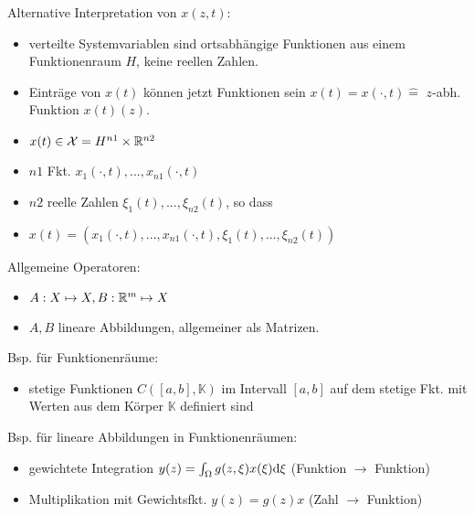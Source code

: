Alternative Interpretation von $x(z,t)$:
\begin{itemize}
\item verteilte Systemvariablen sind ortsabhängige Funktionen aus einem Funktionenraum $H$, keine reellen Zahlen.


\item  Einträge von $x(t)$ können jetzt Funktionen sein
\subitem $x(t) = x(\cdot,t) \hat{=}$ $z$-abh. Funktion $x(t)(z)$.

\item $x(t) \in \mathcal{X} = H^{n1} \times \mathbb{R}^{n2}$ 

\item $n1$ Fkt. $x_1(\cdot,t),...,x_{n1}(\cdot,t)$
\item $n2$ reelle Zahlen $\xi_1(t),...,\xi_{n2}(t)$, so dass

\item $x(t) = (x_1(\cdot,t),...,x_{n1}(\cdot,t),\xi_1(t),...,\xi_{n2}(t))$
\end{itemize}
Allgemeine Operatoren:
\begin{itemize}
\item $A:X\mapsto X, B:\mathbb{R}^m \mapsto X$
\item $A,B$ lineare Abbildungen, allgemeiner als Matrizen. 
\end{itemize}
Bsp. für Funktionenräume:
\begin{itemize}
\item stetige Funktionen $C([a,b],\mathbb{K})$ im Intervall $[a,b]$ auf dem stetige Fkt. mit Werten aus dem Körper $\mathbb{K}$ definiert sind
\end{itemize}
Bsp. für lineare Abbildungen in Funktionenräumen:
\begin{itemize}
\item gewichtete Integration $y(z) = \int_\Omega g(z,\xi)x(\xi) \mathrm{d} \xi$  (Funktion $\rightarrow$ Funktion)
\item Multiplikation mit Gewichtsfkt. $y(z)=g(z)x$ (Zahl $\rightarrow$ Funktion)
\end{itemize}
